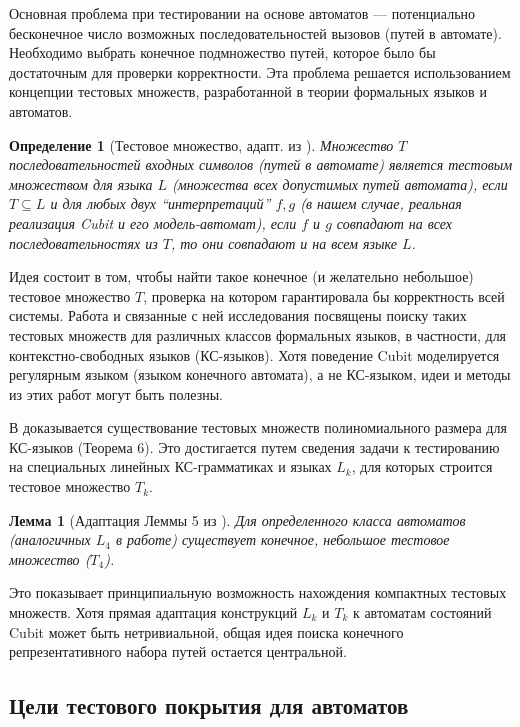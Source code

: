 \documentclass[14pt, russian]{scrartcl}
\newcommand{\enq}[1]{\enquote{#1}}
\newcounter{cDefinition}
\newcounter{cLemma}
\newtheorem{Definition}{Определение}[cDefinition]
\newtheorem{Lemma}{Лемма}[cLemma]
\begin{document}
Основная проблема при тестировании на основе автоматов — потенциально бесконечное число возможных последовательностей вызовов (путей в автомате). Необходимо выбрать конечное подмножество путей, которое было бы достаточным для проверки корректности. Эта проблема решается использованием концепции тестовых множеств, разработанной в теории формальных языков и автоматов.

\begin{Definition}[Тестовое множество, адапт. из \cite{Plandowski1993}]
Множество $T$ последовательностей входных символов (путей в автомате) является \emph{тестовым множеством} для языка $L$ (множества всех допустимых путей автомата), если $T \subseteq L$ и для любых двух \enq{интерпретаций} $f, g$ (в нашем случае, реальная реализация Cubit и его модель-автомат), если $f$ и $g$ совпадают на всех последовательностях из $T$, то они совпадают и на всем языке $L$.
\end{Definition}

Идея состоит в том, чтобы найти такое конечное (и желательно небольшое) тестовое множество $T$, проверка на котором гарантировала бы корректность всей системы. Работа \cite{Plandowski1993} и связанные с ней исследования \cite{Karhumaki1992, Karhumaki1993} посвящены поиску таких тестовых множеств для различных классов формальных языков, в частности, для контекстно-свободных языков (КС-языков). Хотя поведение Cubit моделируется регулярным языком (языком конечного автомата), а не КС-языком, идеи и методы из этих работ могут быть полезны.

В \cite{Plandowski1993} доказывается существование тестовых множеств полиномиального размера для КС-языков (Теорема 6). Это достигается путем сведения задачи к тестированию на специальных линейных КС-грамматиках и языках $L_k$, для которых строится тестовое множество $T_k$.

\begin{Lemma}[Адаптация Леммы 5 из \cite{Plandowski1993}]
Для определенного класса автоматов (аналогичных $L_4$ в работе) существует конечное, небольшое тестовое множество ($T_4$).
\end{Lemma}
Это показывает принципиальную возможность нахождения компактных тестовых множеств. Хотя прямая адаптация конструкций $L_k$ и $T_k$ к автоматам состояний Cubit может быть нетривиальной, общая идея поиска конечного репрезентативного набора путей остается центральной.

\subsection{Цели тестового покрытия для автоматов}
\end{document}
